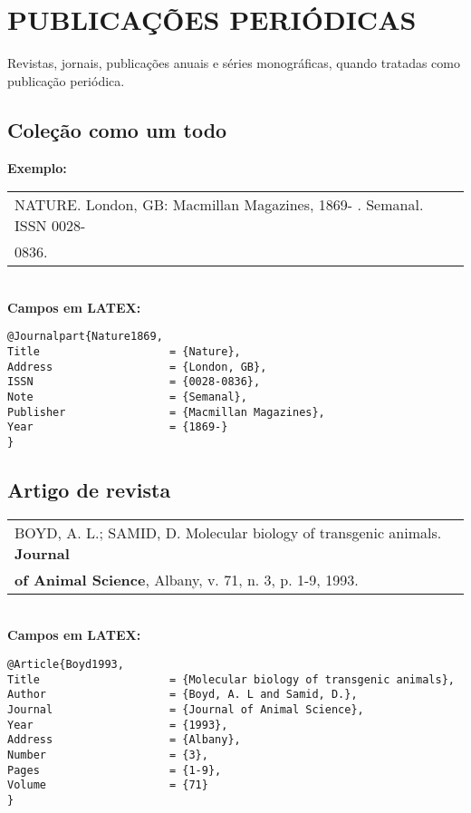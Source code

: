 \section{PUBLICAÇÕES PERIÓDICAS}
	
Revistas, jornais, publicações anuais e séries monográficas, quando
tratadas como publicação periódica. \\
	
\subsection{Coleção como um todo}
	
\textbf{Exemplo:} \\
	
\begin{tabular}{|l|c|} \hline
	NATURE. London, GB: Macmillan Magazines, 1869- . Semanal. ISSN 
	0028-                                                          \\0836.\\\hline
\end{tabular} \\
	
\textbf{Campos em LATEX:} 
	
\begingroup
\fontsize{10pt}{12pt}\selectfont
\begin{verbatim}
@Journalpart{Nature1869,
Title                    = {Nature},
Address                  = {London, GB},
ISSN                     = {0028-0836},
Note                     = {Semanal},
Publisher                = {Macmillan Magazines},
Year                     = {1869-}
}
\end{verbatim}
\endgroup
	
\subsection{Artigo de revista}
	
	
\begin{tabular}{|l|c|} \hline
	BOYD, A. L.; SAMID, D. Molecular biology of transgenic animals. \textbf{Journal } \\ \textbf{of  Animal Science}, Albany, v. 71, n. 3, p. 1-9, 1993.
	                                                                                  \\\hline
\end{tabular} \\
	
\textbf{Campos em LATEX:} 
	
\begingroup
\fontsize{10pt}{12pt}\selectfont
\begin{verbatim}
@Article{Boyd1993,
Title                    = {Molecular biology of transgenic animals},
Author                   = {Boyd, A. L and Samid, D.},
Journal                  = {Journal of Animal Science},
Year                     = {1993},
Address                  = {Albany},
Number                   = {3},
Pages                    = {1-9},
Volume                   = {71}
}
\end{verbatim}
\endgroup
	
